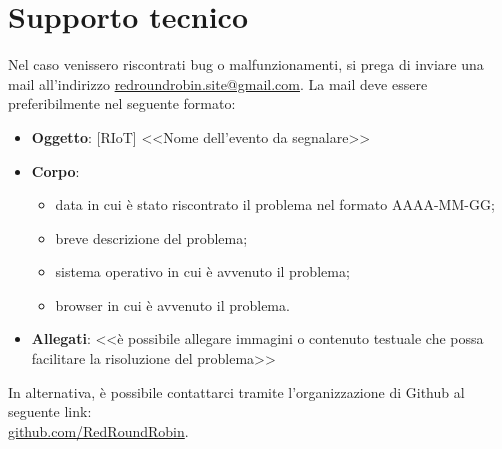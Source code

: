 \section{Supporto tecnico}
Nel caso venissero riscontrati bug o malfunzionamenti, si prega di inviare una mail all'indirizzo \href{mailto:redroundrobin.site@gmail.com}{redroundrobin.site@gmail.com}. La mail deve essere preferibilmente nel seguente formato:
\begin{itemize}
 	\item \textbf{Oggetto}: [RIoT] <<Nome dell'evento da segnalare>> 
 	\item \textbf{Corpo}: 
 		\begin{itemize}
 			\item data in cui è stato riscontrato il problema nel formato AAAA-MM-GG;
 			\item breve descrizione del problema;
 			\item sistema operativo in cui è avvenuto il problema;
 			\item browser in cui è avvenuto il problema.
 		\end{itemize}
 	\item \textbf{Allegati}: <<è possibile allegare immagini o contenuto testuale che possa facilitare la risoluzione del problema>>	
 \end{itemize} 
 In alternativa, è possibile contattarci tramite l'organizzazione di Github al seguente link: \\ \href{https://github.com/RedRoundRobin}{github.com/RedRoundRobin}.